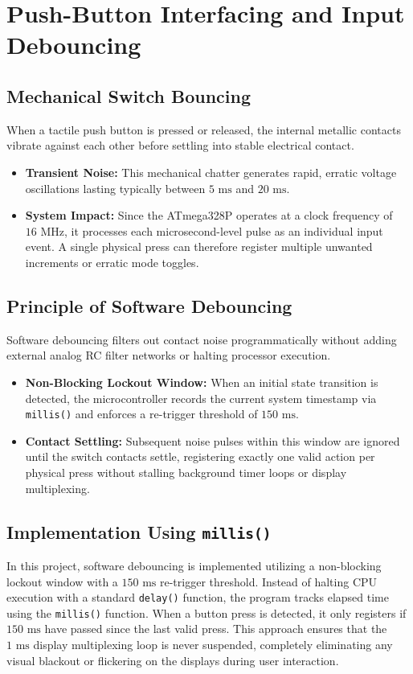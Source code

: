 \documentclass[journal,12pt,onecolumn]{IEEEtran}
\begin{document}
		\section{Push-Button Interfacing and Input Debouncing}
		
		\subsection{Mechanical Switch Bouncing}
		When a tactile push button is pressed or released, the internal metallic contacts vibrate against each other before settling into stable electrical contact.
		\begin{itemize}
			\item \textbf{Transient Noise:} This mechanical chatter generates rapid, erratic voltage oscillations lasting typically between $5\text{ ms}$ and $20\text{ ms}$.
			\item \textbf{System Impact:} Since the ATmega328P operates at a clock frequency of $16\text{ MHz}$, it processes each microsecond-level pulse as an individual input event. A single physical press can therefore register multiple unwanted increments or erratic mode toggles.
		\end{itemize}
		
		\subsection{Principle of Software Debouncing}
		Software debouncing filters out contact noise programmatically without adding external analog RC filter networks or halting processor execution.
		\begin{itemize}
			\item \textbf{Non-Blocking Lockout Window:} When an initial state transition is detected, the microcontroller records the current system timestamp via \texttt{millis()} and enforces a re-trigger threshold of $150\text{ ms}$.
			\item \textbf{Contact Settling:} Subsequent noise pulses within this window are ignored until the switch contacts settle, registering exactly one valid action per physical press without stalling background timer loops or display multiplexing.
		\end{itemize}
		
		\subsection{Implementation Using \texttt{millis()}}
		In this project, software debouncing is implemented utilizing a non-blocking lockout window with a $150\text{ ms}$ re-trigger threshold. Instead of halting CPU execution with a standard \texttt{delay()} function, the program tracks elapsed time using the \texttt{millis()} function. When a button press is detected, it only registers if $150\text{ ms}$ have passed since the last valid press. This approach ensures that the $1\text{ ms}$ display multiplexing loop is never suspended, completely eliminating any visual blackout or flickering on the displays during user interaction.
		
\end{document}
